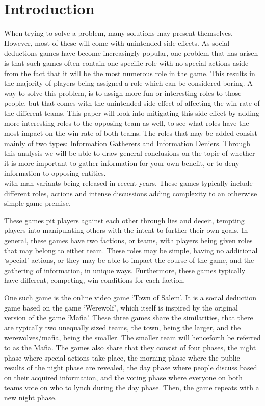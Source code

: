 \section{Introduction}
When trying to solve a problem, many solutions may present themselves. However, 
most of these  will come with unintended side effects. As social deductions 
games have become increasingly popular, one problem that has arisen is that 
such games often contain one specific role with no special actions aside from 
the fact that it will be the most numerous role in the game. This results in 
the majority of players being assigned a role which can be considered boring. A 
way to solve this problem, is to assign more fun or interesting roles to those 
people, but that comes with the unintended side effect of affecting the 
win-rate of the different teams. This paper will look into mitigating this side 
effect by adding more interesting roles to the opposing team as well, to see 
what roles have the most impact on the win-rate of both teams. The roles that 
may be added consist mainly of two types: Information Gatherers and Information 
Deniers. Through this analysis we will be able to draw general conclusions on 
the topic of whether it is more important to gather information for your own 
benefit, or to deny information to opposing entities. \\

with man
variants being released in recent years. These games typically include
different roles, actions and intense discussions adding complexity to an
otherwise simple game premise.

These games pit players against each other through lies and deceit, tempting
players into manipulating others with the intent to further their own goals. In
general, these games have two factions, or teams, with players being given
roles that may belong to either team. These roles may be simple, having no
additional ‘special’ actions, or they may be able to impact the course of the
game, and the gathering of information, in unique ways. Furthermore, these
games typically have different, competing, win conditions for each faction.

One such game is the online video game ‘Town of Salem’. It is a social
deduction game based on the game ‘Werewolf’, which itself is inspired by the
original version of the game ‘Mafia’. These three games share the similarities,
that there are typically two unequally sized teams, the town, being the larger,
and the werewolves/mafia, being the smaller. The smaller team will henceforth
be referred to as the Mafia. The games also share that they consist of four
phases, the night phase where special actions take place, the morning phase
where the public results of the night phase are revealed, the day phase where
people discuss based on their acquired information, and the voting phase where
everyone on both teams vote on who to lynch during the day phase. Then, the
game repeats with a new night phase.

